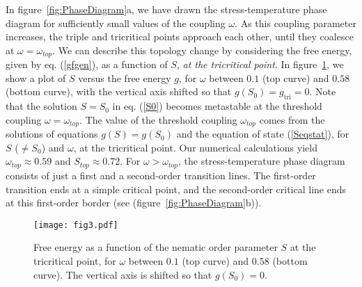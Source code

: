 \documentclass[aps,pre,reprint,amsmath,amssymbols,superscriptaddress,
nofootinbib]{revtex4-1}
\begin{document}
In figure~\ref{fig:PhaseDiagram}a, we have drawn the stress-temperature
phase diagram for sufficiently small values of the coupling $\omega$. As this 
coupling parameter increases, the triple and tricritical points approach each
other, until they coalesce at $\omega=\omega_{top}$. We can describe this
topology change by considering the free energy, given by eq. (\ref{gfgen}), as
a function of $S$, \emph{at the tricritical point}. In figure~\ref{fig:freeEnergy}, we
show a plot of $S$ versus the free energy $g$, for $\omega$ between $0.1 $
(top curve) and $0.58$ (bottom curve), with the vertical axis shifted so that
$g(S_{0})=g_{\text{tri}}=0$. Note that the solution $S=S_{0}$ in eq. (\ref{S0})
becomes metastable at the threshold coupling $\omega=\omega_{top}$. The
value of the threshold coupling $\omega_{top}$ comes from the solutions of
equations $g(S)=g(S_{0})$ and the equation of state (\ref{Seqstat}), for $S$
($\neq S_{0}$) and $\omega$, at the tricritical point. Our numerical calculations
yield $\omega_{top}\approx0.59$ and $S_{top}\approx0.72$. For
$\omega>\omega_{top}$, the stress-temperature phase diagram consists of
just a first and a second-order transition lines. The first-order transition ends at
a simple critical point, and the second-order critical line ends at this first-order
border (see (figure~\ref{fig:PhaseDiagram}b)).%

\begin{figure}[ptb]
\begin{center}
\texttt{[image: fig3.pdf]}%
\caption{Free energy as a function of the nematic order parameter $S$ at the
tricritical point, for $\omega$ between $0.1$ (top curve) and $0.58$ (bottom
curve). The vertical axis is shifted so that $g(S_{0})=0$. }%
\label{fig:freeEnergy}
\end{center}
\end{figure}
\end{document}
